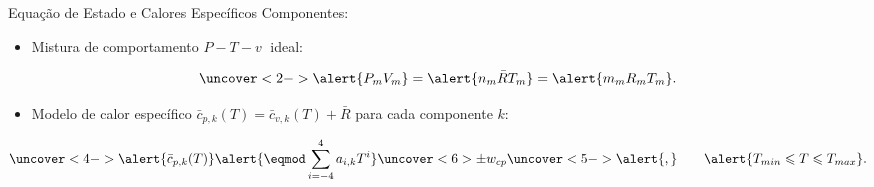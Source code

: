     \begin{frame}{Equação de Estado e Calores Específicos Componentes:}\vspace*{-2em}
        \begin{itemize}
            \item<1-> Mistura de comportamento \alert{$P-T-v\;$ ideal}:
        \end{itemize}
        \vspace*{0.8em}\begin{equation*}
            \uncover<2->{
                \alert{P_mV_m} =
                    \alert{n_m\bar{R}T_m} =
                    \alert{m_mR_mT_m}.
            }
        \end{equation*}
        \begin{itemize}
            \item<3-> Modelo de calor específico \alert{$\bar{c}_{p,k}(T) = \bar{c}_{v,k}(T) +
                \bar{R}$} para cada componente \alert{$k$}:
        \end{itemize}
        \vspace*{0.8em}\begin{equation*}
            \uncover<4->{
                \alert{\bar{c}_{p,k}(T)}
                    \alert{\eqmod \sum_{i=-4}^4 a_{i,k}T^i}
                    \uncover<6>{\pm w_{cp}}
                    \uncover<5->{\alert{,}\qquad\alert{T_{min} \leqslant T \leqslant T_{max}}.}
            }
        \end{equation*}
    \end{frame}

